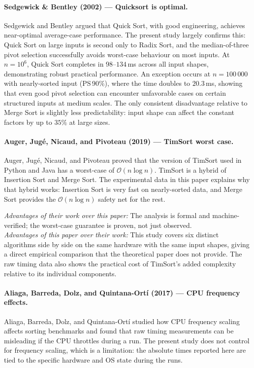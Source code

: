 \documentclass[11pt,a4paper]{article}
\begin{document}
\paragraph{Sedgewick \& Bentley (2002) --- Quicksort is optimal.} Sedgewick and Bentley \cite{sedgewick2002} argued that Quick Sort, with good engineering, achieves near-optimal average-case performance. The present study largely confirms this: Quick Sort on large inputs is second only to Radix Sort, and the median-of-three pivot selection successfully avoids worst-case behaviour on most inputs. At $n = 10^6$, Quick Sort completes in $98$--$134$\,ms across all input shapes, demonstrating robust practical performance. An exception occurs at $n = 100\,000$ with nearly-sorted input (PS\,90\%), where the time doubles to $20.3$\,ms, showing that even good pivot selection can encounter unfavorable cases on certain structured inputs at medium scales. The only consistent disadvantage relative to Merge Sort is slightly less predictability: input shape can affect the constant factors by up to $35\%$ at large sizes.

\paragraph{Auger, Jugé, Nicaud, and Pivoteau (2019) --- TimSort worst case.} Auger, Jugé, Nicaud, and Pivoteau \cite{auger2019} proved that the version of TimSort used in Python and Java has a worst-case of $\mathcal{O}(n \log n)$. TimSort is a hybrid of Insertion Sort and Merge Sort. The experimental data in this paper explains why that hybrid works: Insertion Sort is very fast on nearly-sorted data, and Merge Sort provides the $\mathcal{O}(n \log n)$ safety net for the rest.

\textit{Advantages of their work over this paper:} The analysis is formal and machine-verified; the worst-case guarantee is proven, not just observed.\\
\textit{Advantages of this paper over their work:} This study covers six distinct algorithms side by side on the same hardware with the same input shapes, giving a direct empirical comparison that the theoretical paper does not provide. The raw timing data also shows the practical cost of TimSort's added complexity relative to its individual components.

\paragraph{Aliaga, Barreda, Dolz, and Quintana-Ortí (2017) --- CPU frequency effects.} Aliaga, Barreda, Dolz, and Quintana-Ortí \cite{aliaga2017} studied how CPU frequency scaling affects sorting benchmarks and found that raw timing measurements can be misleading if the CPU throttles during a run. The present study does not control for frequency scaling, which is a limitation: the absolute times reported here are tied to the specific hardware and OS state during the runs.
\end{document}
